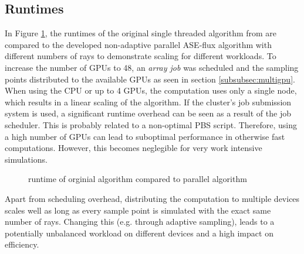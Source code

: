 \subsection{Runtimes}
In Figure \ref{plot:runtime}, the runtimes of the original single threaded
algorithm from \cite{ASE2010} are compared to the developed non-adaptive
parallel ASE-flux algorithm with different numbers of rays to demonstrate
scaling for different workloads. To increase the number of GPUs to 48, an
\emph{array job} was scheduled and the sampling points distributed to the
available GPUs as seen in section \ref{subsubsec:multigpu}.  When using the CPU
or up to 4 GPUs, the computation uses only a single node, which results in a
linear scaling of the algorithm. If the cluster's job submission system is used,
a significant runtime overhead can be seen as a result of the job scheduler.
This is probably related to a non-optimal PBS script. Therefore, using a high
number of GPUs can lead to suboptimal performance in otherwise fast
computations. However, this becomes neglegible for very work intensive
simulations.
\begin{figure}[H]
  \centerline{
    }
  \caption{runtime of orginial algorithm compared to parallel algorithm}
  \label{plot:runtime}
\end{figure}
Apart from scheduling overhead, distributing the computation to multiple devices
scales well as long as every sample point is simulated with the exact same
number of rays. Changing this (e.g. through adaptive sampling), leads to a
potentially unbalanced workload on different devices and a high impact on efficiency.
